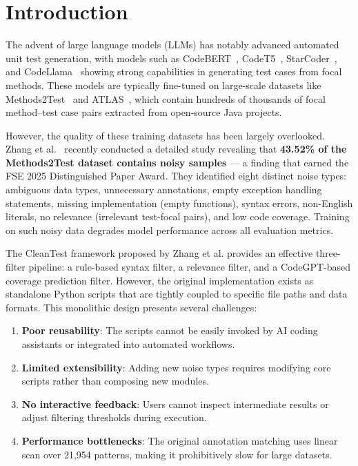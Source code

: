 \documentclass[acmlarge,nonacm,screen]{acmart}
\begin{document}
\maketitle

\tableofcontents
\newpage

\section{Introduction}
\label{sec:introduction}

The advent of large language models (LLMs) has notably advanced automated unit test generation, with models such as CodeBERT~\cite{feng2020codebert}, CodeT5~\cite{wang2021codet5}, StarCoder~\cite{li2023starcoder}, and CodeLlama~\cite{roziere2023code} showing strong capabilities in generating test cases from focal methods. These models are typically fine-tuned on large-scale datasets like Methods2Test~\cite{tufano2022methods2test} and ATLAS~\cite{watson2020atlas}, which contain hundreds of thousands of focal method--test case pairs extracted from open-source Java projects.

However, the quality of these training datasets has been largely overlooked. Zhang et al.~\cite{zhang2025cleantest} recently conducted a detailed study revealing that \textbf{43.52\% of the Methods2Test dataset contains noisy samples} --- a finding that earned the FSE 2025 Distinguished Paper Award. They identified eight distinct noise types: ambiguous data types, unnecessary annotations, empty exception handling statements, missing implementation (empty functions), syntax errors, non-English literals, no relevance (irrelevant test-focal pairs), and low code coverage. Training on such noisy data degrades model performance across all evaluation metrics.

The CleanTest framework proposed by Zhang et al. provides an effective three-filter pipeline: a rule-based syntax filter, a relevance filter, and a CodeGPT-based coverage prediction filter. However, the original implementation exists as standalone Python scripts that are tightly coupled to specific file paths and data formats. This monolithic design presents several challenges:

\begin{enumerate}
    \item \textbf{Poor reusability}: The scripts cannot be easily invoked by AI coding assistants or integrated into automated workflows.
    \item \textbf{Limited extensibility}: Adding new noise types requires modifying core scripts rather than composing new modules.
    \item \textbf{No interactive feedback}: Users cannot inspect intermediate results or adjust filtering thresholds during execution.
    \item \textbf{Performance bottlenecks}: The original annotation matching uses linear scan over 21,954 patterns, making it prohibitively slow for large datasets.
\end{enumerate}
\end{document}

